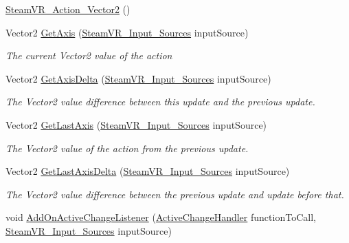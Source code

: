 \begin{DoxyCompactItemize}
\item 
\mbox{\hyperlink{class_valve_1_1_v_r_1_1_steam_v_r___action___vector2_acc03022252e10caa2e44c5a2e4ee180d}{Steam\+V\+R\+\_\+\+Action\+\_\+\+Vector2}} ()
\item 
Vector2 \mbox{\hyperlink{class_valve_1_1_v_r_1_1_steam_v_r___action___vector2_a9313e35bdbdfc18a161484bdd0c8239b}{Get\+Axis}} (\mbox{\hyperlink{namespace_valve_1_1_v_r_a82e5bf501cc3aa155444ee3f0662853f}{Steam\+V\+R\+\_\+\+Input\+\_\+\+Sources}} input\+Source)
\begin{DoxyCompactList}\small\item\em The current Vector2 value of the action \end{DoxyCompactList}\item 
Vector2 \mbox{\hyperlink{class_valve_1_1_v_r_1_1_steam_v_r___action___vector2_a87c7b602c486249f0bb0a8f908fb82c0}{Get\+Axis\+Delta}} (\mbox{\hyperlink{namespace_valve_1_1_v_r_a82e5bf501cc3aa155444ee3f0662853f}{Steam\+V\+R\+\_\+\+Input\+\_\+\+Sources}} input\+Source)
\begin{DoxyCompactList}\small\item\em The Vector2 value difference between this update and the previous update. \end{DoxyCompactList}\item 
Vector2 \mbox{\hyperlink{class_valve_1_1_v_r_1_1_steam_v_r___action___vector2_aaef8a836bd1040eb6854ba7ad5a5d042}{Get\+Last\+Axis}} (\mbox{\hyperlink{namespace_valve_1_1_v_r_a82e5bf501cc3aa155444ee3f0662853f}{Steam\+V\+R\+\_\+\+Input\+\_\+\+Sources}} input\+Source)
\begin{DoxyCompactList}\small\item\em The Vector2 value of the action from the previous update. \end{DoxyCompactList}\item 
Vector2 \mbox{\hyperlink{class_valve_1_1_v_r_1_1_steam_v_r___action___vector2_a3bebc5e4564895072ce9ed9f532b7a97}{Get\+Last\+Axis\+Delta}} (\mbox{\hyperlink{namespace_valve_1_1_v_r_a82e5bf501cc3aa155444ee3f0662853f}{Steam\+V\+R\+\_\+\+Input\+\_\+\+Sources}} input\+Source)
\begin{DoxyCompactList}\small\item\em The Vector2 value difference between the previous update and update before that. \end{DoxyCompactList}\item 
void \mbox{\hyperlink{class_valve_1_1_v_r_1_1_steam_v_r___action___vector2_a69cefbe63ef365944127b0ee3ab056c4}{Add\+On\+Active\+Change\+Listener}} (\mbox{\hyperlink{class_valve_1_1_v_r_1_1_steam_v_r___action___vector2_ad01c83284de71c0d9cd8f7e673ce5ab5}{Active\+Change\+Handler}} function\+To\+Call, \mbox{\hyperlink{namespace_valve_1_1_v_r_a82e5bf501cc3aa155444ee3f0662853f}{Steam\+V\+R\+\_\+\+Input\+\_\+\+Sources}} input\+Source)

\end{DoxyCompactItemize}
